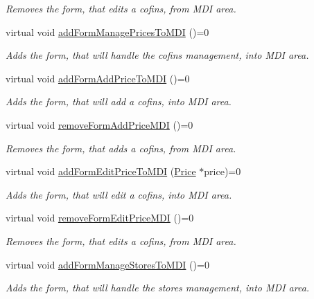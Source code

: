 \begin{DoxyCompactItemize}
\begin{DoxyCompactList}\small\item\em \-Removes the form, that edits a cofins, from \-M\-D\-I area. \end{DoxyCompactList}\item 
virtual void \hyperlink{class_i_main_window_a294e6f6acec66c6b4a12b72f7918eac4}{add\-Form\-Manage\-Prices\-To\-M\-D\-I} ()=0
\begin{DoxyCompactList}\small\item\em \-Adds the form, that will handle the cofins management, into \-M\-D\-I area. \end{DoxyCompactList}\item 
virtual void \hyperlink{class_i_main_window_a1682e766352ce784fb53f65bb231dd60}{add\-Form\-Add\-Price\-To\-M\-D\-I} ()=0
\begin{DoxyCompactList}\small\item\em \-Adds the form, that will add a cofins, into \-M\-D\-I area. \end{DoxyCompactList}\item 
virtual void \hyperlink{class_i_main_window_af5da2039feb274a13cd8d8b902839aa1}{remove\-Form\-Add\-Price\-M\-D\-I} ()=0
\begin{DoxyCompactList}\small\item\em \-Removes the form, that adds a cofins, from \-M\-D\-I area. \end{DoxyCompactList}\item 
virtual void \hyperlink{class_i_main_window_acf4fe6bf64051b8192050d5e882c05cc}{add\-Form\-Edit\-Price\-To\-M\-D\-I} (\hyperlink{class_price}{\-Price} $\ast$price)=0
\begin{DoxyCompactList}\small\item\em \-Adds the form, that will edit a cofins, into \-M\-D\-I area. \end{DoxyCompactList}\item 
virtual void \hyperlink{class_i_main_window_a29cdeed55c757e02f66b225e5823b176}{remove\-Form\-Edit\-Price\-M\-D\-I} ()=0
\begin{DoxyCompactList}\small\item\em \-Removes the form, that edits a cofins, from \-M\-D\-I area. \end{DoxyCompactList}\item 
virtual void \hyperlink{class_i_main_window_a6613337827ff3adc200cf4353aaedd8e}{add\-Form\-Manage\-Stores\-To\-M\-D\-I} ()=0
\begin{DoxyCompactList}\small\item\em \-Adds the form, that will handle the stores management, into \-M\-D\-I area. \end{DoxyCompactList}\item 

\end{DoxyCompactItemize}
